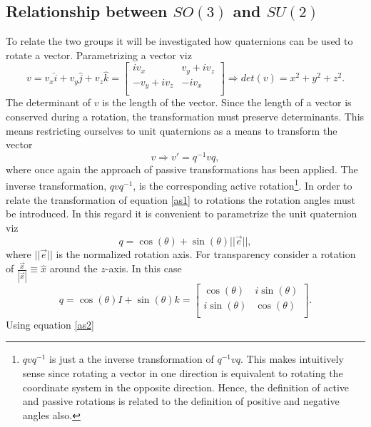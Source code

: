 \subsection{Relationship between $SO(3)$ and $SU(2)$}
To relate the two groups it will be investigated how quaternions can be used to rotate a vector. Parametrizing a vector viz
\begin{equation}
	v=v_x\hat{i}+v_y\hat{j}+v_z\hat{k}=\begin{bmatrix}
		iv_x & v_y+iv_z\\
		-v_y+iv_z & -iv_x\\
	\end{bmatrix}\Rightarrow det(v)=x^2+y^2+z^2.
	\label{as4}
\end{equation} 
The determinant of $v$ is the length of the vector. Since the length of a vector is conserved during a rotation, the transformation must preserve determinants. This means restricting ourselves to unit quaternions as a means to transform the vector
\begin{equation}
	v\Rightarrow v'=q^{-1}vq,
	\label{as1}
\end{equation} 
where once again the approach of passive transformations has been applied. The inverse transformation, $qvq^{-1}$, is the corresponding active rotation\footnote{$qvq^{-1}$ is just a the inverse transformation of $q^{-1}vq$. This makes intuitively sense since rotating a vector in one direction is equivalent to rotating the coordinate system in the opposite direction. Hence, the definition of active and passive rotations is related to the definition of positive and negative angles also.}. In order to relate the transformation of equation \eqref{as1} to rotations the rotation angles must be introduced. In this regard it is convenient to parametrize the unit quaternion viz
\begin{equation}
	q=\cos(\theta)+\sin(\theta)||\vec{e}||,
\end{equation} 
where $||\vec{e}||$ is the normalized rotation axis. For transparency consider a rotation of $\frac{\vec{x}}{|\vec{x}|}\equiv \hat{x}$ around the $z$-axis. In this case
\begin{equation}
	q=\cos(\theta)I+\sin(\theta)k=\begin{bmatrix}
		\cos(\theta) & i\sin(\theta)\\
		i\sin(\theta) & \cos(\theta)\\
	\end{bmatrix}.
	\label{as2}
\end{equation} 
Using equation \eqref{as2}

